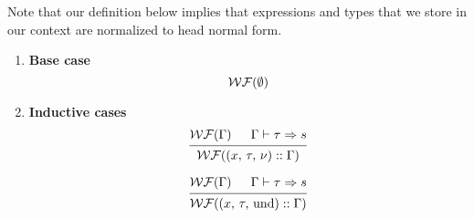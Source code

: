 \documentclass{article}
\begin{document}
\begin{definition} 
  Note that our definition below implies that expressions and types that we
  store in our context are normalized to head normal form.

  \begin{enumerate}
  \item \textbf{Base case} \\
    \[
      \begin{prooftree}
        \hypo{\wf(\emptyset)}
      \end{prooftree}
    \]

  \item \textbf{Inductive cases} \\
    \[
      \begin{prooftree}
        \hypo{\wf(\Gamma)}
        \hypo{\Gamma \vdash \tau \Rightarrow s}
        \infer2{\wf ((x, \, \tau, \, \nu) :: \Gamma)}
      \end{prooftree}
    \]

    \[
      \begin{prooftree}
        \hypo{\wf(\Gamma)}
        \hypo{\Gamma \vdash \tau \Rightarrow s}
        \infer2{\wf ((x, \, \tau, \, \text{und}) :: \Gamma)}
      \end{prooftree}
    \]
  \end{enumerate}
\end{definition}
\end{document}
